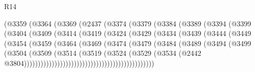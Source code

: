 \begin{lexlean}{R14}
\begin{coremodule}
                      (@3359
                        (@3364
                          (@3369
                            (@2437
                              (@3374
                                (@3379
                                  (@3384
                                    (@3389
                                      (@3394
                                        (@3399
                                          (@3404
                                            (@3409
                                              (@3414
                                                (@3419
                                                  (@3424
                                                    (@3429
                                                      (@3434
                                                        (@3439
                                                          (@3444
                                                            (@3449
                                                              (@3454
                                                                (@3459
                                                                  (@3464
                                                                    (@3469
                                                                      (@3474
                                                                        (@3479
                                                                          (@3484
                                                                            (@3489
                                                                              (@3494
                                                                                (@3499
                                                                                  (@3504
                                                                                    (@3509
                                                                                      (@3514
                                                                                        (@3519
                                                                                          (@3524
                                                                                            (@3529
                                                                                              (@3534
                                                                                                (@2442
                                                                                                  @3804)))))))))))))))))))))))))))))))))))))))))))))))

\end{coremodule}
\end{lexlean}
